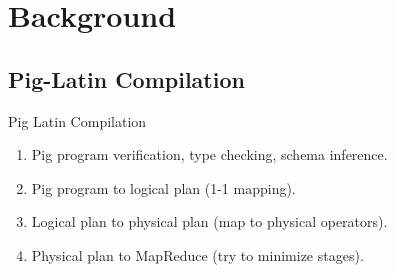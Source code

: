 \section{Background}

\subsection{Pig-Latin Compilation}
\begin{frame}{Pig Latin Compilation}
\begin{enumerate}
	\item Pig program verification, type checking, schema inference.
	\item Pig program to logical plan (1-1 mapping).
	\item Logical plan to physical plan (map to physical operators).
	\item Physical plan to MapReduce (try to minimize stages).
\end{enumerate}
\end{frame}

%

